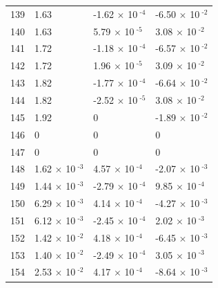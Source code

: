 \documentclass[a4paper,11pt]{article}
\begin{document}
\begin{center}
\begin{longtable}{|R{1.5cm}|R{2.5cm}|R{2.5cm}|R{2.5cm}|}
  139 &   1.63  &        -1.62 $\times$ 10$^{\text{          -4}}$  &        -6.50 $\times$ 10$^{\text{          -2}}$ \\ 
  140 &   1.63  &         5.79 $\times$ 10$^{\text{          -5}}$  &         3.08 $\times$ 10$^{\text{          -2}}$ \\ 
  141 &   1.72  &        -1.18 $\times$ 10$^{\text{          -4}}$  &        -6.57 $\times$ 10$^{\text{          -2}}$ \\ 
  142 &   1.72  &         1.96 $\times$ 10$^{\text{          -5}}$  &         3.09 $\times$ 10$^{\text{          -2}}$ \\ 
  143 &   1.82  &        -1.77 $\times$ 10$^{\text{          -4}}$  &        -6.64 $\times$ 10$^{\text{          -2}}$ \\ 
  144 &   1.82  &        -2.52 $\times$ 10$^{\text{          -5}}$  &         3.08 $\times$ 10$^{\text{          -2}}$ \\ 
  145 &   1.92  & 0  &        -1.89 $\times$ 10$^{\text{          -2}}$ \\ 
  146 & 0  & 0  & 0 \\ 
  147 & 0  & 0  & 0 \\ 
  148 &         1.62 $\times$ 10$^{\text{          -3}}$  &         4.57 $\times$ 10$^{\text{          -4}}$  &        -2.07 $\times$ 10$^{\text{          -3}}$ \\ 
  149 &         1.44 $\times$ 10$^{\text{          -3}}$  &        -2.79 $\times$ 10$^{\text{          -4}}$  &         9.85 $\times$ 10$^{\text{          -4}}$ \\ 
  150 &         6.29 $\times$ 10$^{\text{          -3}}$  &         4.14 $\times$ 10$^{\text{          -4}}$  &        -4.27 $\times$ 10$^{\text{          -3}}$ \\ 
  151 &         6.12 $\times$ 10$^{\text{          -3}}$  &        -2.45 $\times$ 10$^{\text{          -4}}$  &         2.02 $\times$ 10$^{\text{          -3}}$ \\ 
  152 &         1.42 $\times$ 10$^{\text{          -2}}$  &         4.18 $\times$ 10$^{\text{          -4}}$  &        -6.45 $\times$ 10$^{\text{          -3}}$ \\ 
  153 &         1.40 $\times$ 10$^{\text{          -2}}$  &        -2.49 $\times$ 10$^{\text{          -4}}$  &         3.05 $\times$ 10$^{\text{          -3}}$ \\ 
  154 &         2.53 $\times$ 10$^{\text{          -2}}$  &         4.17 $\times$ 10$^{\text{          -4}}$  &        -8.64 $\times$ 10$^{\text{          -3}}$ \\ 

\end{longtable}
\end{center}
\end{document}
